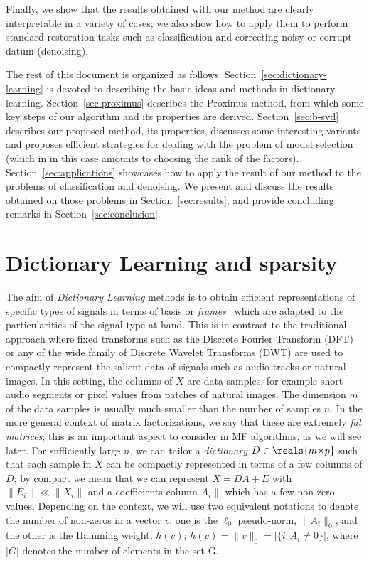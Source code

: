 \documentclass[twocolumn]{IEEEtran}
\begin{document}
Finally, we show that the results obtained with our method are clearly interpretable in a variety of cases; we also show how to apply them to perform standard restoration tasks such as classification and correcting noisy or corrupt datum (denoising).

The rest of this document is organized as follows: Section~\ref{sec:dictionary-learning} is devoted to describing the basic ideas and methods in dictionary learning. Section~\ref{sec:proximus} describes the Proximus method, from which some key steps of our algorithm and its properties are derived. Section~\ref{sec:b-svd} describes our proposed method, its properties, discusses some interesting variants and proposes efficient strategies for dealing with the problem of model selection (which in in this case amounts to choosing the rank of the factors). Section~\ref{sec:applications} showcases how to apply the result of our method to the problems of classification and denoising.
We present and discuss the results obtained on those problems in Section~\ref{sec:results}, and provide concluding remarks in Section~\ref{sec:conclusion}.

\section{Dictionary Learning and sparsity}

The aim of \emph{Dictionary Learning} methods is to obtain efficient representations of specific types of signals in terms of basis or \emph{frames}~\cite{frame-review} which are adapted to the particularities of the signal type at hand. This is in contrast to the traditional approach where fixed transforms such as the Discrete Fourier Transform (DFT) or any of the wide family of Discrete Wavelet Transforms (DWT) are used to compactly represent the salient data of signals such as audio tracks or natural images. In this setting, the columns of $X$ are data samples, for example short audio segments or pixel values from patches of natural images. The dimension $m$ of the data samples is usually much smaller than the number of samples $n$. In the more general context of matrix factorizations, we say that these are extremely \emph{fat matrices}; this is an important aspect to consider in MF algorithms, as we will see later.
For sufficiently large $n$, we can tailor a \emph{dictionary} $D \in \reals{m{\times}p}$ such that each sample in $X$ can be compactly represented in terms of a few columns of $D$; by compact we mean that we can represent $X=DA+E$ with $\|E_i\| \ll \|X_i\|$ and a coefficients column $A_i\|$ which has a few non-zero values. Depending on the context, we will use two equivalent notations to denote the number of non-zeros in a vector $v$: one is the  $\ell_0$ pseudo-norm, $\|A_i\|_0$, and the other is the Hamming weight, $h(v)$; $h(v)=\|v\|_0=|\{i:A_i \neq 0\}|$, where $|G|$ denotes the number of elements in the set G.
\end{document}
